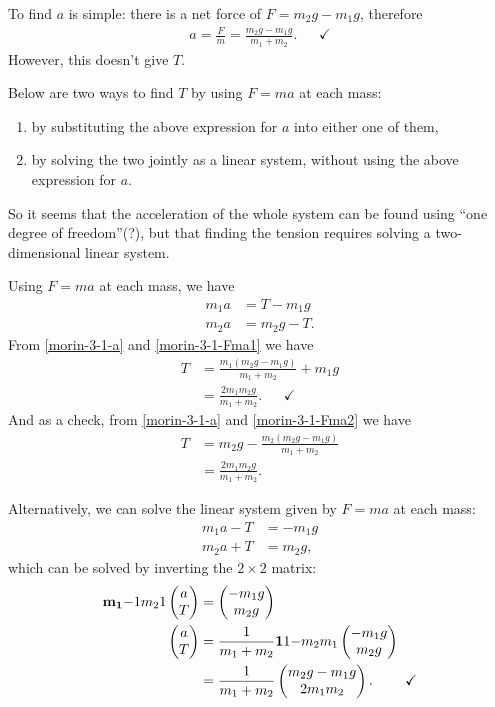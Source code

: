 To find $a$ is simple: there is a net force of $F = m_2g - m_1g$, therefore
\begin{align}
  a = \frac{F}{m} = \frac{m_2g - m_1g}{m_1 + m_2}. \label{morin-3-1-a} ~~~~~~~\checkmark
\end{align}
However, this doesn't give $T$.

Below are two ways to find $T$ by using $F = ma$ at each mass:
\begin{enumerate}
\item by substituting the above expression for $a$ into either one of them,
\item by solving the two jointly as a linear system, without using the above expression for $a$.
\end{enumerate}

So it seems that the acceleration of the whole system can be found using ``one degree of
freedom''(?), but that finding the tension requires solving a two-dimensional linear system.

Using $F = ma$ at each mass, we have
\begin{align}
  m_1a &= T-m_1g   \label{morin-3-1-Fma1}\\
  m_2a &= m_2g - T \label{morin-3-1-Fma2}.
\end{align}
From \eqref{morin-3-1-a} and \eqref{morin-3-1-Fma1} we have
\begin{align*}
  T &= \frac{m_1(m_2g - m_1g)}{m_1 + m_2} + m_1g \\
    &= \frac{2m_1m_2g}{m_1 + m_2}. ~~~~~~~\checkmark
\end{align*}
And as a check, from \eqref{morin-3-1-a} and \eqref{morin-3-1-Fma2} we have
\begin{align*}
  T &= m_2g - \frac{m_2(m_2g - m_1g)}{m_1 + m_2} \\
    &= \frac{2m_1m_2g}{m_1 + m_2}.
\end{align*}

Alternatively, we can solve the linear system given by $F = ma$ at each mass:
\begin{align*}
  m_1a - T &= -m_1g \\
  m_2a + T &= m_2g,
\end{align*}
which can be solved by inverting the $2 \times 2$ matrix:
\begin{align*}
  \mathbf{m_1}{-1}
      {m_2}{1} \begin{pmatrix}a\\T\end{pmatrix} &= \begin{pmatrix}-m_1g\\m_2g\end{pmatrix} \\
  \begin{pmatrix}a\\T\end{pmatrix}              &= \frac{1}{m_1 + m_2} \mathbf{1}{1}
                                                       {-m_2}{m_1} \begin{pmatrix}-m_1g\\m_2g\end{pmatrix} \\
                            &= \frac{1}{m_1 + m_2} \begin{pmatrix}m_2g - m_1g\\2m_1m_2\end{pmatrix}. ~~~~~~~\checkmark
\end{align*}


